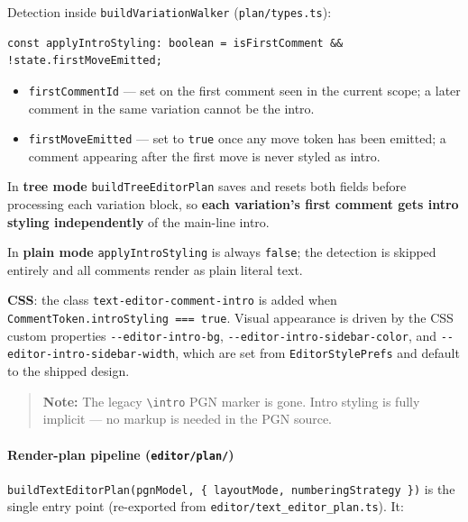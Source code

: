 \documentclass[]{article}
\providecommand{\tightlist}{%
  \setlength{\itemsep}{0pt}\setlength{\parskip}{0pt}}
\let\oldparagraph\paragraph
\renewcommand{\paragraph}[1]{\oldparagraph{#1}\mbox{}}
\begin{document}
Detection inside \texttt{buildVariationWalker} (\texttt{plan/types.ts}):

\begin{verbatim}
const applyIntroStyling: boolean = isFirstComment && !state.firstMoveEmitted;
\end{verbatim}

\begin{itemize}
\tightlist
\item
  \texttt{firstCommentId} --- set on the first comment seen in the
  current scope; a later comment in the same variation cannot be the
  intro.
\item
  \texttt{firstMoveEmitted} --- set to \texttt{true} once any move token
  has been emitted; a comment appearing after the first move is never
  styled as intro.
\end{itemize}

In \textbf{tree mode} \texttt{buildTreeEditorPlan} saves and resets both
fields before processing each variation block, so \textbf{each
variation's first comment gets intro styling independently} of the
main-line intro.

In \textbf{plain mode} \texttt{applyIntroStyling} is always
\texttt{false}; the detection is skipped entirely and all comments
render as plain literal text.

\textbf{CSS}: the class \texttt{text-editor-comment-intro} is added when
\texttt{CommentToken.introStyling\ ===\ true}. Visual appearance is
driven by the CSS custom properties \texttt{-\/-editor-intro-bg},
\texttt{-\/-editor-intro-sidebar-color}, and
\texttt{-\/-editor-intro-sidebar-width}, which are set from
\texttt{EditorStylePrefs} and default to the shipped design.

\begin{quote}
\textbf{Note:} The legacy \texttt{\textbackslash{}intro} PGN marker is
gone. Intro styling is fully implicit --- no markup is needed in the PGN
source.
\end{quote}

\paragraph{\texorpdfstring{Render-plan pipeline
(\texttt{editor/plan/})}{Render-plan pipeline (editor/plan/)}}\label{render-plan-pipeline-editorplan}

\texttt{buildTextEditorPlan(pgnModel,\ \{\ layoutMode,\ numberingStrategy\ \})}
is the single entry point (re-exported from
\texttt{editor/text\_editor\_plan.ts}). It:
\end{document}

